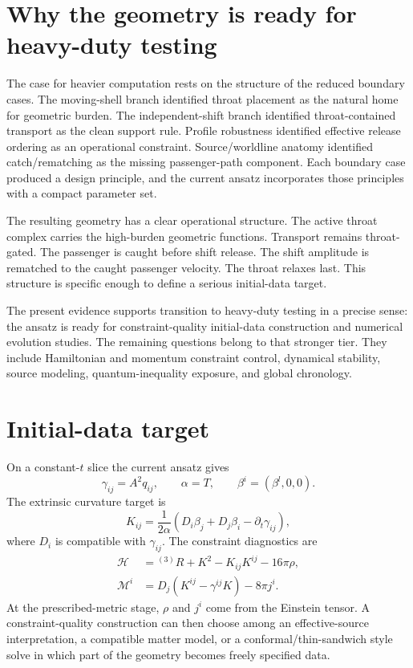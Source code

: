 \documentclass[11pt]{article}
\begin{document}
\section{Why the geometry is ready for heavy-duty testing}
The case for heavier computation rests on the structure of the reduced boundary cases.  The moving-shell branch identified throat placement as the natural home for geometric burden.  The independent-shift branch identified throat-contained transport as the clean support rule.  Profile robustness identified effective release ordering as an operational constraint.  Source/worldline anatomy identified catch/rematching as the missing passenger-path component.  Each boundary case produced a design principle, and the current ansatz incorporates those principles with a compact parameter set.

The resulting geometry has a clear operational structure.  The active throat complex carries the high-burden geometric functions.  Transport remains throat-gated.  The passenger is caught before shift release.  The shift amplitude is rematched to the caught passenger velocity.  The throat relaxes last.  This structure is specific enough to define a serious initial-data target.

The present evidence supports transition to heavy-duty testing in a precise sense: the ansatz is ready for constraint-quality initial-data construction and numerical evolution studies.  The remaining questions belong to that stronger tier.  They include Hamiltonian and momentum constraint control, dynamical stability, source modeling, quantum-inequality exposure, and global chronology.

\section{Initial-data target}
On a constant-$t$ slice the current ansatz gives
\begin{equation}
 \gamma_{ij}=A^2q_{ij},
 \qquad
 \alpha=T,
 \qquad
 \beta^i=(\beta^l,0,0).
\end{equation}
The extrinsic curvature target is
\begin{equation}
 K_{ij}=\frac{1}{2\alpha}\left(D_i\beta_j+D_j\beta_i-\partial_t\gamma_{ij}\right),
 \label{eq:Kij}
\end{equation}
where $D_i$ is compatible with $\gamma_{ij}$.  The constraint diagnostics are
\begin{align}
 \mathcal H&={}^{(3)}R+K^2-K_{ij}K^{ij}-16\pi\rho,\label{eq:H}\\
 \mathcal M^i&=D_j\left(K^{ij}-\gamma^{ij}K\right)-8\pi j^i.\label{eq:M}
\end{align}
At the prescribed-metric stage, $\rho$ and $j^i$ come from the Einstein tensor.  A constraint-quality construction can then choose among an effective-source interpretation, a compatible matter model, or a conformal/thin-sandwich style solve in which part of the geometry becomes freely specified data.
\end{document}
